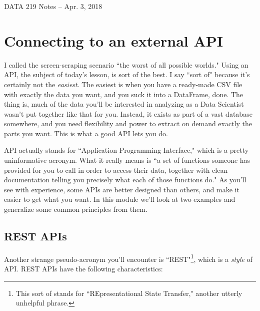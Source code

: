 \documentclass[12pt]{article}
\begin{document}
\begin{center}
\begin{Large}
DATA 219 Notes -- Apr. 3, 2018
\end{Large}
\end{center}

\section{Connecting to an external API}

I called the screen-scraping scenario ``the worst of all possible worlds."
Using an API, the subject of today's lesson, is sort of the best. I say ``sort
of" because it's certainly not the \textit{easiest}. The easiest is when you
have a ready-made CSV file with exactly the data you want, and you suck it
into a DataFrame, done. The thing is, much of the data you'll be interested in
analyzing as a Data Scientist wasn't put together like that for you. Instead,
it exists as part of a vast database somewhere, and you need flexibility and
power to extract on demand exactly the parts you want. This is what a good API
lets you do.

API actually stands for ``Application Programming Interface," which is a
pretty uninformative acronym. What it really means is ``a set of functions
someone has provided for you to call in order to access their data, together
with clean documentation telling you precisely what each of those functions
do." As you'll see with experience, some APIs are better designed than others,
and make it easier to get what you want. In this module we'll look at two
examples and generalize some common principles from them.

\subsection{REST APIs}

Another strange pseudo-acronym you'll encounter is ``REST"\footnote{This sort
of stands for ``REpresentational State Transfer," another utterly unhelpful
phrase.}, which is a \textit{style} of API. REST APIs have the following
characteristics:
\end{document}
